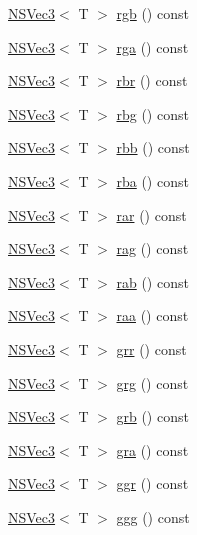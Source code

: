 \begin{DoxyCompactItemize}
\item 
\hyperlink{structNSVec3}{N\-S\-Vec3}$<$ T $>$ \hyperlink{structNSVec4_a54bc64bbce6c1c2f5c3ec53778c71025}{rgb} () const 
\item 
\hyperlink{structNSVec3}{N\-S\-Vec3}$<$ T $>$ \hyperlink{structNSVec4_aab727ee3966c9ec2474fcde30106ed9c}{rga} () const 
\item 
\hyperlink{structNSVec3}{N\-S\-Vec3}$<$ T $>$ \hyperlink{structNSVec4_aafc9b9f70d481c8a188f80c552ea8397}{rbr} () const 
\item 
\hyperlink{structNSVec3}{N\-S\-Vec3}$<$ T $>$ \hyperlink{structNSVec4_a4d448ed3f9f496603502a0fa234e2193}{rbg} () const 
\item 
\hyperlink{structNSVec3}{N\-S\-Vec3}$<$ T $>$ \hyperlink{structNSVec4_aaba227e3000fa8b3b8236d39e19cd438}{rbb} () const 
\item 
\hyperlink{structNSVec3}{N\-S\-Vec3}$<$ T $>$ \hyperlink{structNSVec4_a4101ad746525b7b4e9ebc5f8e1f8ddd7}{rba} () const 
\item 
\hyperlink{structNSVec3}{N\-S\-Vec3}$<$ T $>$ \hyperlink{structNSVec4_aabcc5ba6251a4724483546ba51cf28f7}{rar} () const 
\item 
\hyperlink{structNSVec3}{N\-S\-Vec3}$<$ T $>$ \hyperlink{structNSVec4_ab00bc3643b98fa807d89ab5c1a9b7d6e}{rag} () const 
\item 
\hyperlink{structNSVec3}{N\-S\-Vec3}$<$ T $>$ \hyperlink{structNSVec4_a0b45ac28ac245d41e49f7a4cb62df061}{rab} () const 
\item 
\hyperlink{structNSVec3}{N\-S\-Vec3}$<$ T $>$ \hyperlink{structNSVec4_aba16871f14e39fe7aca4faee64b9818c}{raa} () const 
\item 
\hyperlink{structNSVec3}{N\-S\-Vec3}$<$ T $>$ \hyperlink{structNSVec4_a775b4758dc3777433767a9e356099462}{grr} () const 
\item 
\hyperlink{structNSVec3}{N\-S\-Vec3}$<$ T $>$ \hyperlink{structNSVec4_a1e0f4c267e472f6c2bfb514620d22e97}{grg} () const 
\item 
\hyperlink{structNSVec3}{N\-S\-Vec3}$<$ T $>$ \hyperlink{structNSVec4_a2329b8ae09a20541189fa367f228e55c}{grb} () const 
\item 
\hyperlink{structNSVec3}{N\-S\-Vec3}$<$ T $>$ \hyperlink{structNSVec4_adf21203282e76fb5a34454c1ceea555c}{gra} () const 
\item 
\hyperlink{structNSVec3}{N\-S\-Vec3}$<$ T $>$ \hyperlink{structNSVec4_a7f5b81833c5e0e917e5e9c350dc1ad56}{ggr} () const 
\item 
\hyperlink{structNSVec3}{N\-S\-Vec3}$<$ T $>$ \hyperlink{structNSVec4_aeb2d4734dcb85b982af418d6b37f38be}{ggg} () const 

\end{DoxyCompactItemize}
